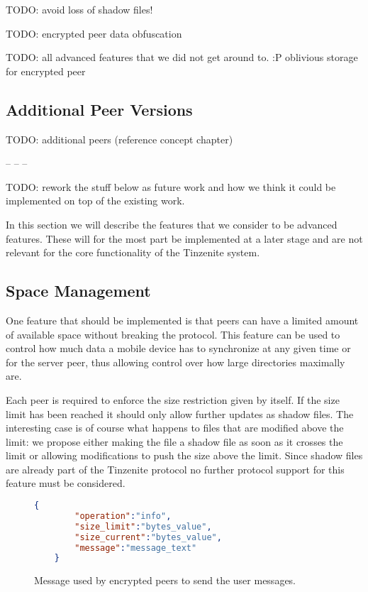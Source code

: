 TODO: avoid loss of shadow files!

TODO: encrypted peer data obfuscation

TODO: all advanced features that we did not get around to. :P
oblivious storage for encrypted peer

\subsection{Additional Peer Versions}
\label{sub:Additional Peer Versions}

TODO: additional peers (reference concept chapter)

-- -- --

TODO: rework the stuff below as future work and how we think it could be implemented on top of the existing work.

In this section we will describe the features that we consider to be advanced features.
These will for the most part be implemented at a later stage and are not relevant for the core functionality of the Tinzenite system.

\subsection{Space Management}
\label{sub:Space Management}

One feature that should be implemented is that peers can have a limited amount of available space without breaking the protocol.
This feature can be used to control how much data a mobile device has to synchronize at any given time or for the server peer, thus allowing control over how large directories maximally are.

Each peer is required to enforce the size restriction given by itself.
If the size limit has been reached it should only allow further updates as shadow files.
The interesting case is of course what happens to files that are modified above the limit: we propose either making the file a shadow file as soon as it crosses the limit or allowing modifications to push the size above the limit.
Since shadow files are already part of the Tinzenite protocol no further protocol support for this feature must be considered.

\begin{figure}[htp]
    \begin{lstlisting}[language=json,firstnumber=0]
    {
        "operation":"info",
        "size_limit":"bytes_value",
        "size_current":"bytes_value",
        "message":"message_text"
    }
    \end{lstlisting}
\caption[Information Message]{Message used by encrypted peers to send the user messages.}
\label{json:info_message}
\end{figure}

